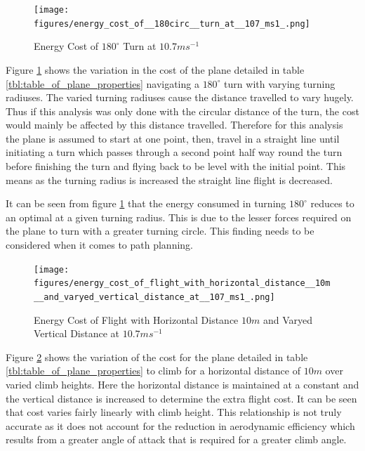 \documentclass[a4paper,12pt,twoside]{article}
\begin{document}
\begin{figure}
\centering
\texttt{[image: figures/energy\_cost\_of\_\_180circ\_\_turn\_at\_\_107\_ms1\_.png]} 
\caption{Energy Cost of $180^{\circ}$ Turn at $10.7 ms^{-1}$}
\label{fig:energy_cost_of_180circ_turn_at_107_ms1_}
\end{figure}

Figure \ref{fig:energy_cost_of_180circ_turn_at_107_ms1_} shows the variation in the cost of the plane detailed in table \ref{tbl:table_of_plane_properties} navigating a $180^{\circ}$ turn with varying turning radiuses. The varied turning radiuses cause the distance travelled to vary hugely. Thus if this analysis was only done with the circular distance of the turn, the cost would mainly be affected by this distance travelled. Therefore for this analysis the plane is assumed to start at one point, then, travel in a straight line until initiating a turn which passes through a second point half way round the turn before finishing the turn and flying back to be level with the initial point. This means as the turning radius is increased the straight line flight is decreased.

It can be seen from figure \ref{fig:energy_cost_of_180circ_turn_at_107_ms1_} that the energy consumed in turning $180^{\circ}$ reduces to an optimal at a given turning radius. This is due to the lesser forces required on the plane to turn with a greater turning circle. This finding needs to be considered when it comes to path planning.

\begin{figure}
\centering
\texttt{[image: figures/energy\_cost\_of\_flight\_with\_horizontal\_distance\_\_10m\_\_and\_varyed\_vertical\_distance\_at\_\_107\_ms1\_.png]} 
\caption{Energy Cost of Flight with Horizontal Distance $10m$ and Varyed Vertical Distance at $10.7 ms^{-1}$}
\label{fig:energy_cost_of_flight_with_horizontal_distance_10m_and_varyed_vertical_distance_at_107_ms1_}
\end{figure}

Figure \ref{fig:energy_cost_of_flight_with_horizontal_distance_10m_and_varyed_vertical_distance_at_107_ms1_} shows the variation of the cost for the plane detailed in table \ref{tbl:table_of_plane_properties} to climb for a horizontal distance of $10m$ over varied climb heights. Here the horizontal distance is maintained at a constant and the vertical distance is increased to determine the extra flight cost. It can be seen that cost varies fairly linearly with climb height. This relationship is not truly accurate as it does not account for the reduction in aerodynamic efficiency which results from a greater angle of attack that is required for a greater climb angle. 
\end{document}
